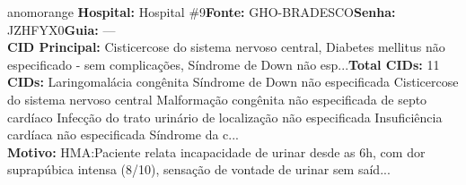 \documentclass[a4paper,10pt]{article}
\begin{document}
\begin{anomalycard}[Interna\c{c}\~{a}o \#118126 | Pac. \#98017 | ALTO (z=3.66) | LOS: 2d | 21/02/2026\,$\to$\,23/02/2026]{anomorange}
\textbf{Hospital:} Hospital \#9\quad \textbf{Fonte:} GHO-BRADESCO\quad \textbf{Senha:} JZHFYX0\quad \textbf{Guia:} ---\\

\textbf{CID Principal:} {\small Cisticercose do sistema nervoso central, Diabetes mellitus não especificado - sem complicações, Síndrome de Down não esp...}\quad\textbf{Total CIDs:} 11\\

\textbf{CIDs:} {\scriptsize Laringomalácia congênita \textbar{} Síndrome de Down não especificada \textbar{} Cisticercose do sistema nervoso central \textbar{} Malformação congênita não especificada de septo cardíaco \textbar{} Infecção do trato urinário de localização não especificada \textbar{} Insuficiência cardíaca não especificada \textbar{} Síndrome da c...}\\

\textbf{Motivo:} {\scriptsize HMA:Paciente relata incapacidade de urinar desde as 6h, com dor suprapúbica intensa (8/10), sensação de vontade de urinar sem saíd...}\\




\end{anomalycard}
\end{document}
